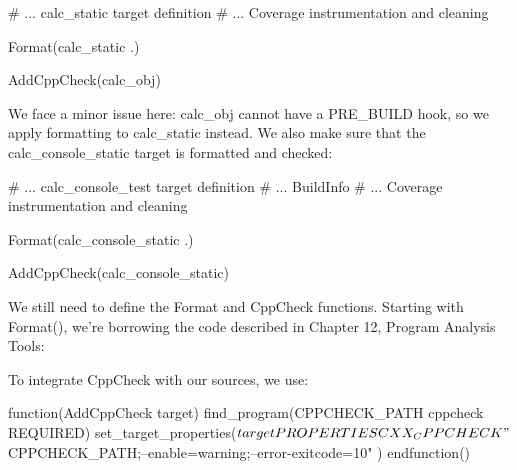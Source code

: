 
\begin{cmake}
# ... calc_static target definition
# ... Coverage instrumentation and cleaning

Format(calc_static .)

AddCppCheck(calc_obj)
\end{cmake}

We face a minor issue here: calc\_obj cannot have a PRE\_BUILD hook, so we apply formatting to calc\_static instead. We also make sure that the calc\_console\_static target is formatted and checked:


\begin{cmake}
# ... calc_console_test target definition
# ... BuildInfo
# ... Coverage instrumentation and cleaning

Format(calc_console_static .)

AddCppCheck(calc_console_static)
\end{cmake}

We still need to define the Format and CppCheck functions. Starting with Format(), we’re borrowing the code described in Chapter 12, Program Analysis Tools:



To integrate CppCheck with our sources, we use:


\begin{cmake}
function(AddCppCheck target)
    find_program(CPPCHECK_PATH cppcheck REQUIRED)
    set_target_properties(${target}
    PROPERTIES CXX_CPPCHECK
        "${CPPCHECK_PATH};--enable=warning;--error-exitcode=10"
    )
endfunction()
\end{cmake}

